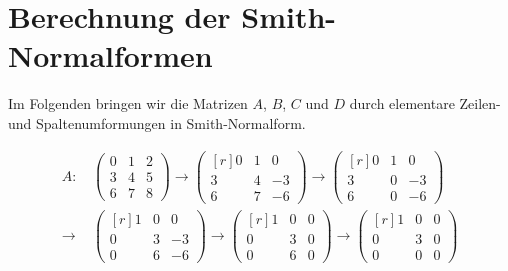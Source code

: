 \documentclass[a4paper,10pt,numbers=noenddot]{scrartcl}
\begin{document}
\section{Berechnung der Smith-Normalformen}

Im Folgenden bringen wir die Matrizen $A$, $B$, $C$ und $D$ durch elementare Zeilen- und Spaltenumformungen in Smith-Normalform.

\begin{align*}
  A:
  &\,
  \begin{pmatrix}
    0 & 1 & 2 \\
    3 & 4 & 5 \\
    6 & 7 & 8
  \end{pmatrix}
  \to
  \begin{pmatrix*}[r]
    0 & 1 &  0  \\
    3 & 4 & -3  \\
    6 & 7 & -6
  \end{pmatrix*}
  \to
  \begin{pmatrix*}[r]
    0 & 1 &  0  \\
    3 & 0 & -3  \\
    6 & 0 & -6
  \end{pmatrix*}
  \\
  \to&\,
  \begin{pmatrix*}[r]
    1 & 0 &  0  \\
    0 & 3 & -3  \\
    0 & 6 & -6
  \end{pmatrix*}
  \to
  \begin{pmatrix*}[r]
    1 & 0 & 0 \\
    0 & 3 & 0 \\
    0 & 6 & 0
  \end{pmatrix*}
  \to
  \begin{pmatrix*}[r]
    1 & 0 & 0 \\
    0 & 3 & 0 \\
    0 & 0 & 0
  \end{pmatrix*}
\end{align*}
\end{document}
